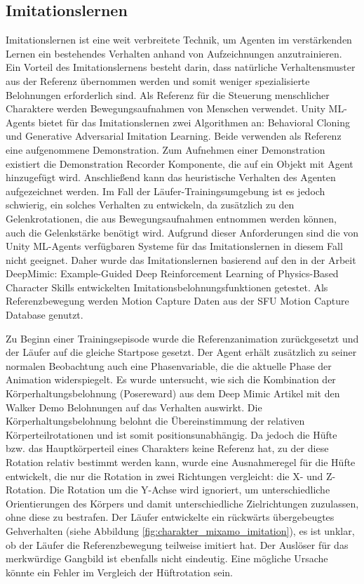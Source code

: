 \subsection{Imitationslernen}
Imitationslernen ist eine weit verbreitete Technik, um Agenten im verstärkenden Lernen ein bestehendes Verhalten anhand von Aufzeichnungen anzutrainieren. Ein Vorteil des Imitationslernens besteht darin, dass natürliche Verhaltensmuster aus der Referenz übernommen werden und somit weniger spezialisierte Belohnungen erforderlich sind. Als Referenz für die Steuerung menschlicher Charaktere werden Bewegungsaufnahmen von Menschen verwendet. Unity ML-Agents bietet für das Imitationslernen zwei Algorithmen an: Behavioral Cloning und Generative Adversarial Imitation Learning. Beide verwenden als Referenz eine aufgenommene Demonstration. Zum Aufnehmen einer Demonstration existiert die Demonstration Recorder Komponente, die auf ein Objekt mit Agent hinzugefügt wird. Anschließend kann das heuristische Verhalten des Agenten aufgezeichnet werden. Im Fall der Läufer-Trainingsumgebung ist es jedoch schwierig, ein solches Verhalten zu entwickeln, da zusätzlich zu den Gelenkrotationen, die aus Bewegungsaufnahmen entnommen werden können, auch die Gelenkstärke benötigt wird. Aufgrund dieser Anforderungen sind die von Unity ML-Agents verfügbaren Systeme für das Imitationslernen in diesem Fall nicht geeignet. Daher wurde das Imitationslernen basierend auf den in der Arbeit \grqq{}DeepMimic: Example-Guided Deep Reinforcement Learning of Physics-Based Character Skills\grqq{} entwickelten Imitationsbelohnungsfunktionen getestet.\cite{peng2018deepmimic} Als Referenzbewegung werden Motion Capture Daten aus der \grqq{}SFU Motion Capture Database\grqq{} genutzt.\cite{sfu-motion-capture}

Zu Beginn einer Trainingsepisode wurde die Referenzanimation zurückgesetzt und der Läufer auf die gleiche Startpose gesetzt. Der Agent erhält zusätzlich zu seiner normalen Beobachtung auch eine Phasenvariable, die die aktuelle Phase der Animation widerspiegelt. Es wurde untersucht, wie sich die Kombination der Körperhaltungsbelohnung (Posereward) aus dem Deep Mimic Artikel mit den Walker Demo Belohnungen auf das Verhalten auswirkt. Die Körperhaltungsbelohnung belohnt die Übereinstimmung der relativen Körperteilrotationen und ist somit positionsunabhängig. Da jedoch die Hüfte bzw. das Hauptkörperteil eines Charakters keine Referenz hat, zu der diese Rotation relativ bestimmt werden kann, wurde eine Ausnahmeregel für die Hüfte entwickelt, die nur die Rotation in zwei Richtungen vergleicht: die X- und Z-Rotation. Die Rotation um die Y-Achse wird ignoriert, um unterschiedliche Orientierungen des Körpers und damit unterschiedliche Zielrichtungen zuzulassen, ohne diese zu bestrafen. Der Läufer entwickelte ein rückwärts übergebeugtes Gehverhalten (siehe Abbildung \ref{fig:charakter_mixamo_imitation}), es ist unklar, ob der Läufer die Referenzbewegung teilweise imitiert hat. Der Auslöser für das merkwürdige Gangbild ist ebenfalls nicht eindeutig. Eine mögliche Ursache könnte ein Fehler im Vergleich der Hüftrotation sein.

